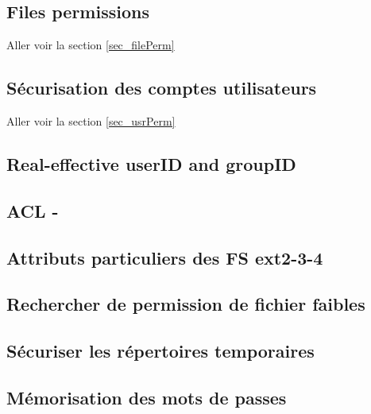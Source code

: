 \documentclass[resume]{subfiles}
\begin{document}
\subsection{Files permissions}
Aller voir la section \ref{sec_filePerm}

\subsection{Sécurisation des comptes utilisateurs}
Aller voir la section \ref{sec_usrPerm}

\subsection{Real-effective userID and groupID}

\subsection{ACL - }

\subsection{Attributs particuliers des FS ext2-3-4}

\subsection{Rechercher de permission de fichier faibles}

\subsection{Sécuriser les répertoires temporaires}

\subsection{Mémorisation des mots de passes}
\end{document}
